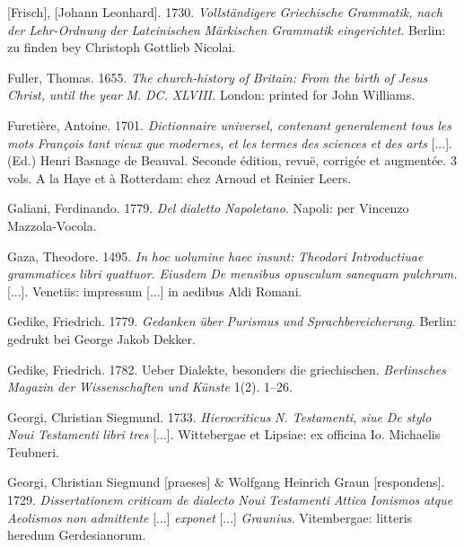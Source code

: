 [Frisch], [Johann Leonhard]. 1730. \textit{Vollständigere} \textit{Griechische} \textit{Grammatik,} \textit{nach} \textit{der} \textit{Lehr-Ordnung} \textit{der} \textit{Lateinischen} \textit{Märkischen} \textit{Grammatik} \textit{eingerichtet}. Berlin: zu finden bey Christoph Gottlieb Nicolai.

Fuller, Thomas. 1655. \textit{The} \textit{church-history} \textit{of} \textit{Britain:} \textit{From} \textit{the} \textit{birth} \textit{of} \textit{Jesus} \textit{Christ,} \textit{until} \textit{the} \textit{year} \textit{M.} \textit{DC.} \textit{XLVIII.} London: printed for John Williams.

Furetière, Antoine. 1701. \textit{Dictionnaire} \textit{universel,} \textit{contenant} \textit{generalement} \textit{tous} \textit{les} \textit{mots} \textit{François} \textit{tant} \textit{vieux} \textit{que} \textit{modernes,} \textit{et} \textit{les} \textit{termes} \textit{des} \textit{sciences} \textit{et} \textit{des} \textit{arts} [...]. (Ed.) Henri Basnage de Beauval. Seconde édition, revuë, corrigée et augmentée. 3 vols. A la Haye et à Rotterdam: chez Arnoud et Reinier Leers.

Galiani, Ferdinando. 1779. \textit{Del} \textit{dialetto} \textit{Napoletano}. Napoli: per Vincenzo Mazzola-Vocola.

Gaza, Theodore. 1495. \textit{In} \textit{hoc} \textit{uolumine} \textit{haec} \textit{insunt:} \textit{Theodori} \textit{Introductiuae} \textit{grammatices} \textit{libri} \textit{quattuor.} \textit{Eiusdem} \textit{De} \textit{mensibus} \textit{opusculum} \textit{sanequam} \textit{pulchrum.} [...]. Venetiis: impressum [...] in aedibus Aldi Romani.

Gedike, Friedrich. 1779. \textit{Gedanken} \textit{über} \textit{Purismus} \textit{und} \textit{Sprachbereicherung}. Berlin: gedrukt bei George Jakob Dekker.

Gedike, Friedrich. 1782. Ueber Dialekte, besonders die griechischen. \textit{Berlinsches} \textit{Magazin} \textit{der} \textit{Wissenschaften} \textit{und} \textit{Künste} 1(2). 1–26.

Georgi, Christian Siegmund. 1733. \textit{Hierocriticus} \textit{N.} \textit{Testamenti,} \textit{siue} \textit{De} \textit{stylo} \textit{Noui} \textit{Testamenti} \textit{libri} \textit{tres} [...]. Wittebergae et Lipsiae: ex officina Io. Michaelis Teubneri.

Georgi, Christian Siegmund [praeses] \& Wolfgang Heinrich Graun [respondens]. 1729. \textit{Dissertationem} \textit{criticam} \textit{de} \textit{dialecto} \textit{Noui} \textit{Testamenti} \textit{Attica} \textit{Ionismos} \textit{atque} \textit{Aeolismos} \textit{non} \textit{admittente} [...] \textit{exponet} [...] \textit{Graunius}. Vitembergae: litteris heredum Gerdesianorum.

